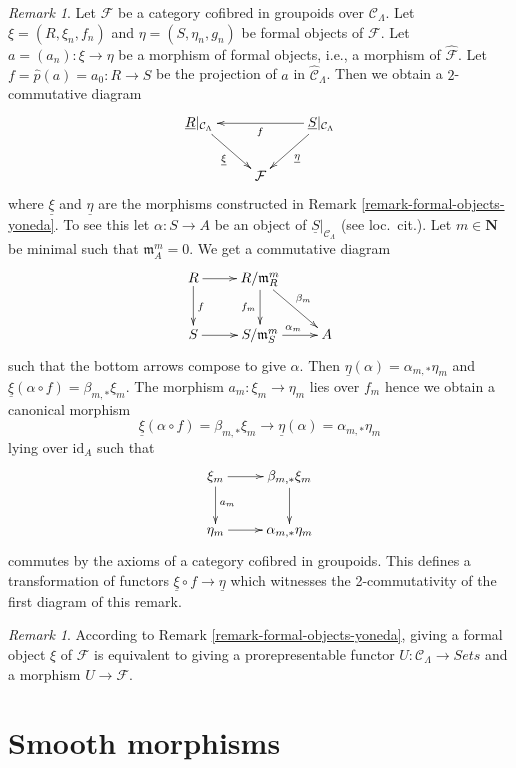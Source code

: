 \documentclass{stacks-project}
\theoremstyle{plain}
\theoremstyle{definition}
\theoremstyle{remark}
\newtheorem{remark}[subsection]{Remark}
\numberwithin{equation}{subsection}
\begin{document}
\begin{remark}
\label{remark-formal-objects-yoneda-map}
Let $\mathcal{F}$ be a category cofibred in groupoids over
$\mathcal{C}_\Lambda$. Let $\xi = (R, \xi_n, f_n)$ and
$\eta = (S, \eta_n, g_n)$ be formal objects of $\mathcal{F}$.
Let $a = (a_n) : \xi \to \eta$ be a morphism of formal objects, i.e.,
a morphism of $\widehat{\mathcal{F}}$. Let
$f = \widehat{p}(a) = a_0 : R \to S$ be the projection of $a$ in
$\widehat{\mathcal{C}}_\Lambda$. Then we obtain a $2$-commutative
diagram
$$
\xymatrix{
\underline{R}|_{\mathcal{C}_\Lambda} \ar[rd]_{\underline{\xi}} & &
\underline{S}|_{\mathcal{C}_\Lambda} \ar[ll]^f \ar[ld]^{\underline{\eta}} \\
& \mathcal{F}
}
$$
where $\underline{\xi}$ and $\underline{\eta}$ are the morphisms
constructed in
Remark \ref{remark-formal-objects-yoneda}.
To see this let $\alpha : S \to A$ be an object of
$\underline{S}|_{\mathcal{C}_\Lambda}$ (see loc.\ cit.).
Let $m \in \mathbf{N}$ be minimal such that $\mathfrak m_A^m = 0$.
We get a commutative diagram
$$
\xymatrix{
R \ar[d]^f \ar[r] & R/\mathfrak m_R^m \ar[d]_{f_m} \ar[rd]^{\beta_m} \\
S \ar[r] & S/\mathfrak m_S^m \ar[r]^{\alpha_m} & A
}
$$
such that the bottom arrows compose to give $\alpha$.
Then $\underline{\eta}(\alpha) = \alpha_{m, *}\eta_m$ and
$\underline{\xi}(\alpha \circ f) = \beta_{m, *}\xi_m$. The morphism
$a_m : \xi_m \to \eta_m$ lies over $f_m$ hence we obtain a canonical
morphism
$$
\underline{\xi}(\alpha \circ f) = \beta_{m, *}\xi_m
\longrightarrow
\underline{\eta}(\alpha) = \alpha_{m, *}\eta_m
$$
lying over $\text{id}_A$ such that
$$
\xymatrix{
\xi_m \ar[r] \ar[d]^{a_m} &  \beta_{m, *}\xi_m \ar[d] \\
\eta_m \ar[r] &  \alpha_{m, *}\eta_m
}
$$
commutes by the axioms of a category cofibred in groupoids. This defines
a transformation of functors $\underline{\xi} \circ f \to \underline{\eta}$
which witnesses the 2-commutativity of the first diagram of this remark.
\end{remark}

\begin{remark}
\label{remark-spell-out-formal-object}
According to Remark \ref{remark-formal-objects-yoneda}, giving a formal object
$\xi$ of $\mathcal{F}$ is equivalent to giving a prorepresentable functor
$U : \mathcal{C}_\Lambda \to \textit{Sets}$ and a morphism
$U \to \mathcal{F}$.
\end{remark}




\section{Smooth morphisms}
\label{section-smooth-morphisms}
\end{document}
